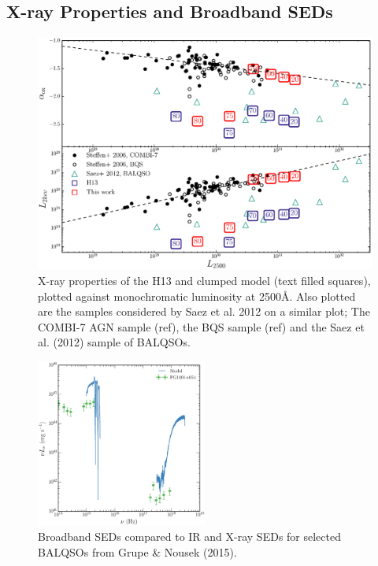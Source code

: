 \documentclass[preprint, a4paper, 11pt]{aastex}
\begin{document}
\subsection{X-ray Properties and Broadband SEDs}

\begin{figure} %
\centering
\includegraphics[width=1.0\textwidth]{figures/alpha_ox_both.eps}
\caption
{
X-ray properties of the H13 and clumped model (text filled 
squares), plotted against monochromatic luminosity 
at 2500\AA. Also plotted are the samples considered by
Saez et al. 2012 on a similar plot; The COMBI-7 AGN sample (ref),
the BQS sample (ref) and the Saez et al. (2012) sample of BALQSOs.
}
\label{fig:xray}
\end{figure} %

\begin{figure}
\centering
\includegraphics[width=0.5\textwidth]{figures/xray_spectrum_lnu.eps}
\caption
{
Broadband SEDs compared to IR and X-ray SEDs for selected BALQSOs 
from Grupe \& Nousek (2015).
}
\label{fig:xray}
\end{figure}
\end{document}
